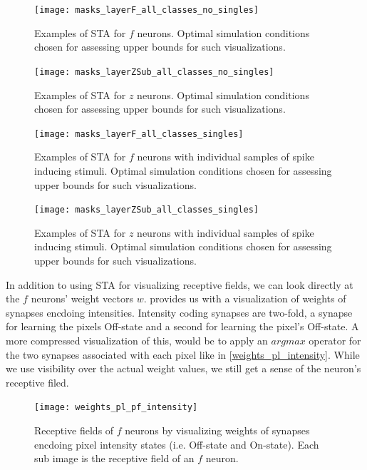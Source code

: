 \documentclass{report}
\begin{document}
\begin{figure}[ht]
\centering
\texttt{[image: masks\_layerF\_all\_classes\_no\_singles]}
\caption{Examples of STA for $f$ neurons. Optimal simulation conditions chosen for assessing upper bounds for such visualizations.
\label{fig:masks_layerF_all_classes_no_singles}}
\end{figure}

\begin{figure}[ht]
\centering
\texttt{[image: masks\_layerZSub\_all\_classes\_no\_singles]}
\caption{Examples of STA for $z$ neurons. Optimal simulation conditions chosen for assessing upper bounds for such visualizations.
\label{fig:masks_layerZ_all_classes_no_singles}}
\end{figure}

\begin{figure}[ht]
\centering
\texttt{[image: masks\_layerF\_all\_classes\_singles]}
\caption{Examples of STA for $f$ neurons with individual samples of spike inducing stimuli. Optimal simulation conditions chosen for assessing upper bounds for such visualizations.
\label{fig:masks_layerF_all_classes_no_singles}}
\end{figure}

\begin{figure}[ht]
\centering
\texttt{[image: masks\_layerZSub\_all\_classes\_singles]}
\caption{Examples of STA for $z$ neurons with individual samples of spike inducing stimuli. Optimal simulation conditions chosen for assessing upper bounds for such visualizations.
\label{fig:masks_layerZSub_all_classes_singles}}
\end{figure}

In addition to using STA for visualizing receptive fields, we can look directly at the $f$ neurons' weight vectors \textbf{$w$}.  provides us with a visualization of weights of synapses encdoing intensities. Intensity coding synapses are two-fold, a synapse for learning the pixels Off-state and a second for learning the pixel's Off-state. A more compressed visualization of this, would be to apply an $argmax$ operator for the two synapses associated with each pixel like in \cref{weights_pl_intensity}. While we use visibility over the actual weight values, we still get a sense of the neuron's receptive filed.

\begin{figure}[ht]
\centering
\texttt{[image: weights\_pl\_pf\_intensity]}
\caption{Receptive fields of $f$ neurons by visualizing weights of synapses encdoing pixel intensity states (i.e. Off-state and On-state). Each sub image is the receptive field of an $f$ neuron.
\label{fig:weights_pl_pf_intensity}}
\end{figure}
\end{document}
